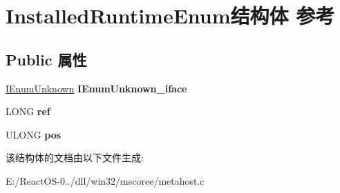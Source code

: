 \hypertarget{struct_installed_runtime_enum}{}\section{Installed\+Runtime\+Enum结构体 参考}
\label{struct_installed_runtime_enum}
\subsection*{Public 属性}
\begin{DoxyCompactItemize}
\item 
\mbox{\label{struct_installed_runtime_enum_a20e603c835047155e2d5538dfb2f0631}} 
\hyperlink{interface_i_enum_unknown}{I\+Enum\+Unknown} {\bfseries I\+Enum\+Unknown\+\_\+iface}
\item 
\mbox{\label{struct_installed_runtime_enum_ae2154da761fade4b66fe9effef230d61}} 
L\+O\+NG {\bfseries ref}
\item 
\mbox{\label{struct_installed_runtime_enum_acf70dbccb2ccfa38eaeb57c08336d2a7}} 
U\+L\+O\+NG {\bfseries pos}
\end{DoxyCompactItemize}


该结构体的文档由以下文件生成\+:\begin{DoxyCompactItemize}
\item 
E\+:/\+React\+O\+S-\/0../dll/win32/mscoree/metahost.\+c\end{DoxyCompactItemize}
